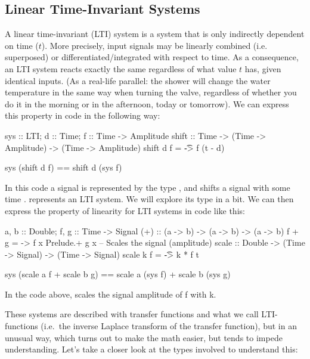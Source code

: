 \subsection{Linear Time-Invariant Systems}\label{sec:ltisprimer}
A linear time-invariant (LTI) system is a system that is only indirectly dependent on time ($t$). More precisely, input signals may be linearly combined (i.e. superposed) or differentiated/integrated with respect to time.
As a consequence, an LTI system reacts exactly the same regardless of what value $t$ has, given identical inputs. (As a real-life parallel: the shower will change the water temperature in the same way when turning the valve, regardless of whether you do it in the morning or in the afternoon, today or tomorrow). We can express this property in code in the following way:
\begin{codeeq}
sys :: LTI; d :: Time; f :: Time -> Amplitude
shift :: Time -> (Time -> Amplitude) -> (Time -> Amplitude)
shift d f = \t -> f (t - d)
\end{codeeq}
\begin{codeeq}
sys (shift d f) == shift d (sys f)
\end{codeeq}
In this code a signal is represented by the type , and  shifts a signal  with some time .  represents an LTI system. We will explore its type in a bit.
We can then express the property of linearity for LTI systems in code like this:
\begin{codeeq}
a, b :: Double; f, g :: Time -> Signal
(+) :: (a -> b) -> (a -> b) -> (a -> b)
f + g = \x -> f x Prelude.+ g x
-- Scales the signal (amplitude)
scale :: Double -> (Time -> Signal) -> (Time -> Signal)
scale k f = \t -> k * f t
\end{codeeq}
\begin{codeeq}
sys (scale a f + scale b g) 
    == scale a (sys f) + scale b (sys g)
\end{codeeq}
In the code above,  scales the signal amplitude of f with k.

These systems are described with transfer functions and what we call LTI-functions (i.e.~the inverse Laplace transform of the transfer function), but in an unusual way, which turns out to make the math easier, but tends to impede understanding. Let's take a closer look at the types involved to understand this:

